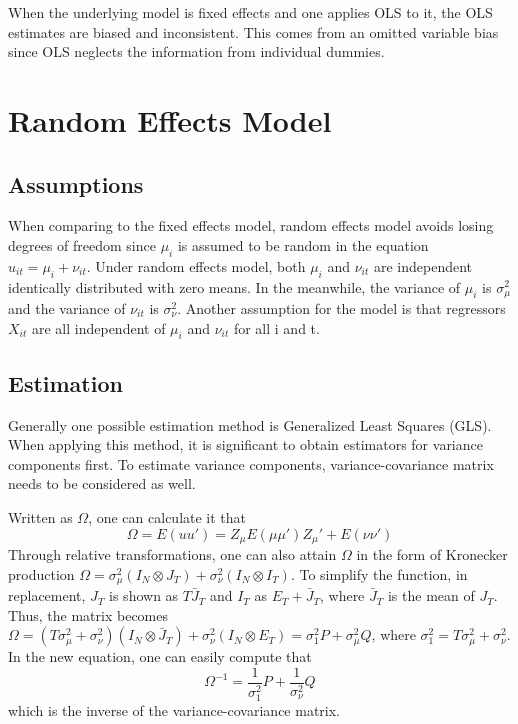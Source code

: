 \documentclass[11pt, a4paper, leqno]{article}
\begin{document}
When the underlying model is fixed effects and one applies OLS to it, the OLS estimates are biased and inconsistent. This comes from an omitted variable bias since OLS neglects the information from individual dummies.


\section{Random Effects Model}
\subsection{Assumptions}
    When comparing to the fixed effects model, random effects model avoids losing degrees of freedom since $\mu_i$ is assumed to be random in the equation ${u_{it} = \mu_i + \nu_{it}}$. Under random effects model, both $\mu_i$ and $\nu_{it}$ are independent identically distributed with zero means. In the meanwhile, the variance of $\mu_i$ is $\sigma_\mu ^2$ and the variance of $\nu_{it}$ is $\sigma_\nu ^2$. Another assumption for the model is that regressors $X_{it}$ are all independent of $\mu_i$ and $\nu_{it}$ for all i and t.


\subsection{Estimation}
Generally one possible estimation method is Generalized Least Squares (GLS). When applying this method, it is significant to obtain estimators for variance components first. To estimate variance components, variance-covariance matrix needs to be considered as well.

Written as $\Omega$, one can calculate it that 
    \begin{equation}
    \Omega = E(uu') = Z_\mu E(\mu \mu')Z_\mu' + E(\nu\nu')
    \end{equation}
Through relative transformations, one can also attain $\Omega$ in the form of Kronecker production
$\Omega = \sigma_\mu^2(I_N \otimes J_T) + \sigma_\nu^2(I_N \otimes I_T)$. To simplify the function, in replacement, $J_T$ is shown as $T\bar J_T$ and $I_T$ as $E_T + \bar J_T$, where $\bar J_T$ is the mean of $J_T$. Thus, the matrix becomes $\Omega = (T\sigma_\mu^2 + \sigma_\nu^2)(I_N \otimes \bar J_T) + \sigma_\nu^2(I_N \otimes E_T) = \sigma_1^2P + \sigma_\mu^2Q$, where $\sigma_1^2 = T\sigma_\mu^2 + \sigma_\nu^2$. In the new equation, one can easily compute that 
    \begin{equation}
    \Omega^{-1} = \frac{1}{\sigma_1^2} P + \frac{1}{\sigma_\nu^2} Q
    \end{equation} 
which is the inverse of the variance-covariance matrix.
\end{document}
